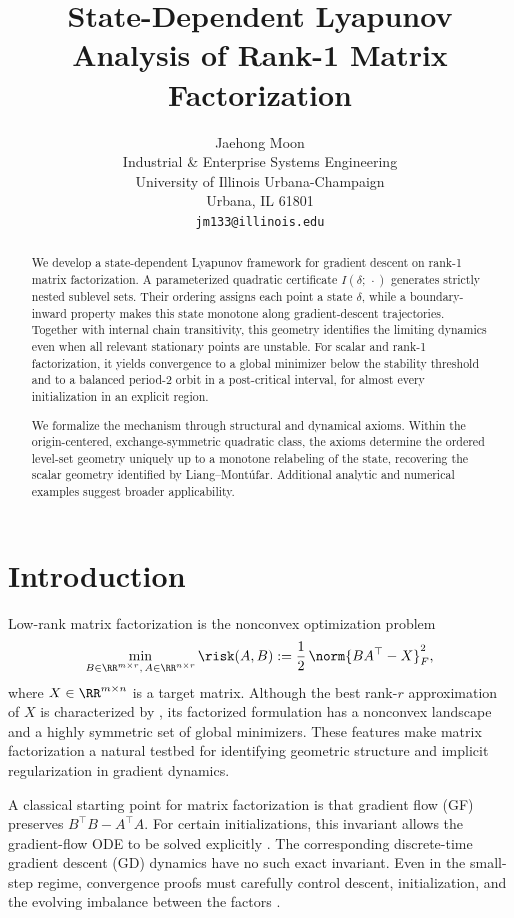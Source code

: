\documentclass{article}
\date{}          %
\title{State-Dependent Lyapunov Analysis of Rank-1 Matrix Factorization}
\author{%
  Jaehong Moon\\
  Industrial \& Enterprise Systems Engineering\\
  University of Illinois Urbana-Champaign\\
  Urbana, IL 61801 \\
  \texttt{jm133@illinois.edu} \\
}
\begin{document}
\maketitle

\begin{abstract}
We develop a state-dependent Lyapunov framework for gradient descent on rank-1 matrix factorization. A parameterized quadratic certificate
$I(\delta;\,\cdot)$ generates strictly nested sublevel sets. Their ordering
assigns each point a state $\delta$, while a boundary-inward property
makes this state monotone along gradient-descent trajectories.
Together with internal chain transitivity, this geometry identifies the
limiting dynamics even when all relevant stationary points are unstable. For
scalar and rank-1 factorization, it yields convergence to a global minimizer
below the stability threshold and to a balanced period-$2$ orbit in a
post-critical interval, for almost every initialization in an explicit region.

We formalize the mechanism through structural and dynamical axioms. Within the
origin-centered, exchange-symmetric quadratic class, the axioms determine the
ordered level-set geometry uniquely up to a monotone relabeling of the state,
recovering the scalar geometry identified by Liang--Mont{\'u}far.
Additional analytic and numerical examples suggest broader applicability.
\end{abstract}


\section{Introduction}

Low-rank matrix factorization is the nonconvex optimization problem
\begin{align}\label{eq:lrmf_problem}
    \min_{B \in \RR^{m \times r},\, A \in \RR^{n \times r}}
    \risk(A,B)
    := \frac{1}{2}\,\norm{BA^\top - X}_F^2,
\end{align}
where $X \in \RR^{m \times n}$ is a target matrix. Although the best rank-$r$
approximation of $X$ is characterized by \citet{eckart1936approximation}, its
factorized formulation has a nonconvex landscape and a highly symmetric set of
global minimizers. These features make matrix factorization a
natural testbed for identifying geometric structure and implicit regularization
in gradient dynamics.

A classical starting point for matrix factorization is that gradient flow (GF)
preserves $B^\top B-A^\top A$. For certain initializations, this invariant
allows the gradient-flow ODE to be solved explicitly
\citep{tarmoun2021understanding}. The corresponding discrete-time gradient
descent (GD) dynamics have no such exact invariant. Even in the small-step
regime, convergence proofs must carefully control descent, initialization, and
the evolving imbalance between the factors
\citep{du2018algorithmic,ye2021global,jiang2023algorithmic}.
\end{document}
